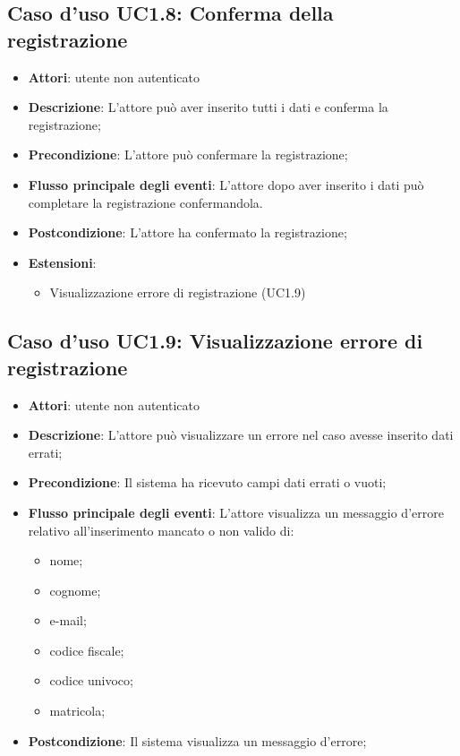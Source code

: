 \subsection{Caso d'uso \texorpdfstring{UC1.8}{UC1.8}: Conferma della registrazione}
\begin{itemize}
\item \textbf{Attori}: utente non autenticato
\item \textbf{Descrizione}: L'attore può aver inserito tutti i dati  e conferma la registrazione;
\item \textbf{Precondizione}: L'attore può confermare la registrazione;
\item \textbf{Flusso principale degli eventi}: L'attore dopo aver inserito i dati può completare la registrazione confermandola.
\item \textbf{Postcondizione}: L'attore ha confermato la registrazione;
\item \textbf{Estensioni}:
\begin{itemize}
\item Visualizzazione errore di registrazione (UC1.9)
\end{itemize}
\end{itemize}
\subsection{Caso d'uso \texorpdfstring{UC1.9}{UC1.9}: Visualizzazione errore di registrazione}
\begin{itemize}
\item \textbf{Attori}: utente non autenticato
\item \textbf{Descrizione}: L'attore può visualizzare un errore nel caso avesse inserito dati errati;
\item \textbf{Precondizione}: Il sistema ha ricevuto campi dati errati o vuoti;
\item \textbf{Flusso principale degli eventi}: L'attore visualizza un messaggio d'errore relativo all'inserimento mancato o non valido di:
\begin{itemize}
\item nome;
\item cognome;
\item e-mail;
\item codice fiscale;
\item codice univoco;
\item matricola;
\end{itemize}
\item \textbf{Postcondizione}: Il sistema visualizza un messaggio d'errore;
\end{itemize}
